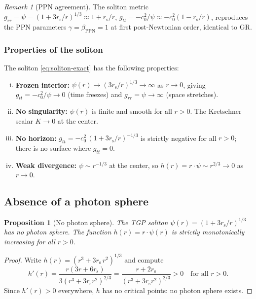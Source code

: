 \documentclass[11pt,a4paper]{article}
\newtheorem{proposition}[theorem]{Proposition}
\theoremstyle{definition}
\theoremstyle{remark}
\newtheorem{remark}[theorem]{Remark}
\newcommand{\rs}{r_{\mathrm{s}}}
\begin{document}
\begin{remark}[PPN agreement]\label{rem:ppn}
The soliton metric
$g_{rr} = \psi = (1+3\rs/r)^{1/3} \approx 1 + \rs/r$,
$g_{tt} = -c_0^2/\psi \approx -c_0^2(1 - \rs/r)$,
reproduces the PPN parameters $\gamma = \beta_{\mathrm{PPN}} = 1$
at first post-Newtonian order, identical to GR.
\end{remark}

\subsubsection{Properties of the soliton}

The soliton \eqref{eq:soliton-exact} has the following properties:

\begin{enumerate}[(i)]
\item \textbf{Frozen interior:}\quad
  $\psi(r) \to (3\rs/r)^{1/3} \to \infty$ as $r \to 0$, giving
  $g_{tt} = -c_0^2/\psi \to 0$ (time freezes) and
  $g_{rr} = \psi \to \infty$ (space stretches).

\item \textbf{No singularity:}\quad
  $\psi(r)$ is finite and smooth for all $r > 0$.
  The Kretschner scalar $K \to 0$ at the center.

\item \textbf{No horizon:}\quad
  $g_{tt} = -c_0^2\,(1 + 3\rs/r)^{-1/3}$ is strictly negative
  for all $r > 0$; there is no surface where $g_{tt} = 0$.

\item \textbf{Weak divergence:}\quad
  $\psi \sim r^{-1/3}$ at the center, so $h(r) = r\cdot\psi
  \sim r^{2/3} \to 0$ as $r \to 0$.
\end{enumerate}

\subsection{Absence of a photon sphere}\label{ssec:no-photon-sphere}

\begin{proposition}[No photon sphere]\label{prop:no-ps}
The TGP soliton $\psi(r) = (1 + 3\rs/r)^{1/3}$ has no photon sphere.
The function $h(r) = r\cdot\psi(r)$ is strictly monotonically increasing
for all $r > 0$.
\end{proposition}

\begin{proof}
Write $h(r) = (r^3 + 3\rs\,r^2)^{1/3}$ and compute
\begin{equation}
  h'(r) = \frac{r(3r + 6\rs)}{3(r^3 + 3\rs r^2)^{2/3}}
  = \frac{r + 2\rs}{(r^3 + 3\rs r^2)^{2/3}} > 0
  \quad \text{for all } r > 0.
\end{equation}
Since $h'(r) > 0$ everywhere, $h$ has no critical points:
no photon sphere exists.
\end{proof}
\end{document}
